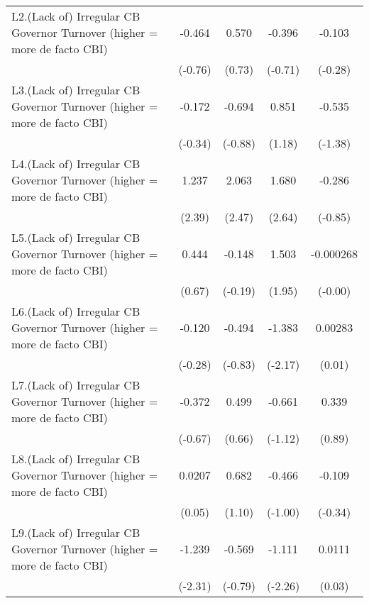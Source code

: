 {\begin{longtable}{l*{4}{c}}
\addlinespace
L2.(Lack of) Irregular CB Governor Turnover (higher = more de facto CBI)&   -0.464         &    0.570         &   -0.396         &   -0.103         \\
                &  (-0.76)         &   (0.73)         &  (-0.71)         &  (-0.28)         \\
\addlinespace
L3.(Lack of) Irregular CB Governor Turnover (higher = more de facto CBI)&   -0.172         &   -0.694         &    0.851         &   -0.535         \\
                &  (-0.34)         &  (-0.88)         &   (1.18)         &  (-1.38)         \\
\addlinespace
L4.(Lack of) Irregular CB Governor Turnover (higher = more de facto CBI)&    1.237\sym{*}  &    2.063\sym{*}  &    1.680\sym{**} &   -0.286         \\
                &   (2.39)         &   (2.47)         &   (2.64)         &  (-0.85)         \\
\addlinespace
L5.(Lack of) Irregular CB Governor Turnover (higher = more de facto CBI)&    0.444         &   -0.148         &    1.503         &-0.000268         \\
                &   (0.67)         &  (-0.19)         &   (1.95)         &  (-0.00)         \\
\addlinespace
L6.(Lack of) Irregular CB Governor Turnover (higher = more de facto CBI)&   -0.120         &   -0.494         &   -1.383\sym{*}  &  0.00283         \\
                &  (-0.28)         &  (-0.83)         &  (-2.17)         &   (0.01)         \\
\addlinespace
L7.(Lack of) Irregular CB Governor Turnover (higher = more de facto CBI)&   -0.372         &    0.499         &   -0.661         &    0.339         \\
                &  (-0.67)         &   (0.66)         &  (-1.12)         &   (0.89)         \\
\addlinespace
L8.(Lack of) Irregular CB Governor Turnover (higher = more de facto CBI)&   0.0207         &    0.682         &   -0.466         &   -0.109         \\
                &   (0.05)         &   (1.10)         &  (-1.00)         &  (-0.34)         \\
\addlinespace
L9.(Lack of) Irregular CB Governor Turnover (higher = more de facto CBI)&   -1.239\sym{*}  &   -0.569         &   -1.111\sym{*}  &   0.0111         \\
                &  (-2.31)         &  (-0.79)         &  (-2.26)         &   (0.03)         \\

\end{longtable}}
